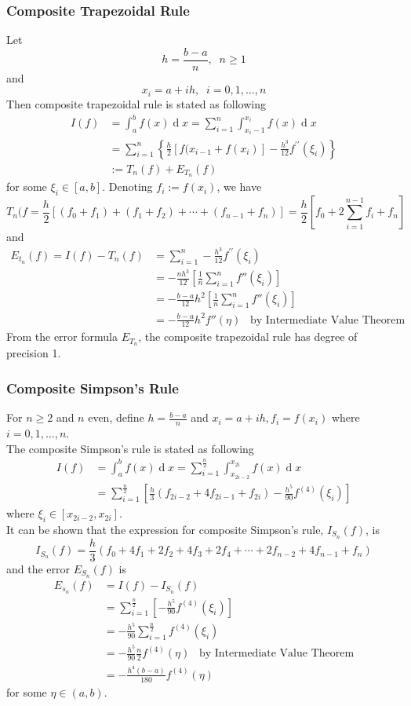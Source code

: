 \documentclass[12pt]{article}
\theoremstyle{definition}
\DeclareMathOperator{\diff}{d}
\begin{document}
\subsubsection{Composite Trapezoidal Rule}
Let
\[
h=\frac{b-a}{n},\;\;n\geq 1
\]
and
\[
x_i = a+ih,\;\; i=0,1,\ldots, n
\]
Then composite trapezoidal rule is stated as following
\begin{align*}
I(f)&=\int_a^b f(x)\diff x = \sum_{i=1}^n\int_{x_i-1}^{x_{i}}f(x)\diff x\\
&=\sum_{i=1}^n \left\{\frac{h}{2}[f(x_{i-1}+f(x_i)]-\frac{h^3}{12}f^{\prime\prime}(\xi_i)\right\}\\
&:=T_n(f)+E_{T_n}(f)
\end{align*}
for some $\xi_i\in[a,b]$. Denoting $f_i:=f(x_i)$, we have
\[
T_n(f=\frac{h}{2}[(f_0+f_1)+(f_1+f_2)+\cdots+(f_{n-1}+f_n)]=\frac{h}{2}[f_0+2\sum_{i=1}^{n-1}f_i+f_n]
\]
and
\begin{align*}
E_{t_n}(f)=I(f)-T_n(f)&=\sum_{i=1}^n-\frac{h^3}{12}f^{\prime\prime}(\xi_i)\\
&=-\frac{nh^3}{12}\left[\frac{1}{n}\sum_{i=1}^n f''(\xi_i)\right]\\
&=-\frac{b-a}{12}h^2\left[\frac{1}{n}\sum_{i=1}^n f''(\xi_i)\right]\\
&=-\frac{b-a}{12}h^2f''(\eta)\;\;\;\text{by Intermediate Value Theorem}
\end{align*}
From the error formula $E_{T_n}$, the composite trapezoidal rule has degree of precision 1.
\subsubsection{Composite Simpson's Rule}
For $n\geq 2$ and $n$ even, define $h=\frac{b-a}{n}$ and $x_i=a+ih, f_i=f(x_i)$ where $i=0,1,\ldots, n$. \\The composite Simpson's rule is stated as following
\begin{align*}
I(f)&=\int_{a}^bf(x)\diff x = \sum_{i=1}^\frac{n}{2}\int_{x_{2i-2}}^{x_{2i}}f(x)\diff x\\
&=\sum_{i=1}^\frac{n}{2}\left[\frac{h}{3}(f_{2i-2}+4f_{2i-1}+f_{2i})-\frac{h^5}{90}f^{(4)}(\xi_i)\right]
\end{align*}
where $\xi_i\in[x_{2i-2},x_{2i}]$.\\
It can be shown that the expression for composite Simpson's rule, $I_{S_n}(f)$, is
\[
I_{S_n}(f)=\frac{h}{3}(f_0+4f_1+2f_2+4f_3+2f_4+\cdots+2f_{n-2}+4f_{n-1}+f_n)
\]
and the error $E_{S_n}(f)$ is
\begin{align*}
E_{s_n}(f)&=I(f)-I_{S_n}(f)\\
&=\sum_{i=1}^\frac{n}{2}\left[-\frac{h^5}{90}f^{(4)}(\xi_i)\right]\\
&=-\frac{h^5}{90}\sum_{i=1}^\frac{n}{2}f^{(4)}(\xi_i)\\
&=-\frac{h^5}{90}\frac{n}{2}f^{(4)}(\eta)\;\;\;\text{by Intermediate Value Theorem}\\
&=-\frac{h^4(b-a)}{180}f^{(4)}(\eta)
\end{align*}
for some $\eta\in(a,b)$.
\end{document}
